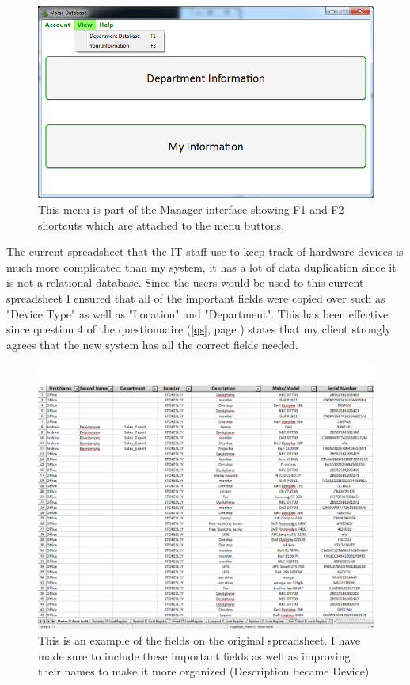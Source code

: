 \begin{figure}[H]
    \includegraphics[width=\textwidth]{./Evaluation/Images/shortcuts2.png}
    \caption{This menu is part of the Manager interface showing F1 and F2 shortcuts which are attached to the menu buttons.} 
\end{figure}


The current spreadsheet that the IT staff use to keep track of hardware devices is much more complicated than my system, it has a lot of data duplication since it is not a relational database. Since the users would be used to this current spreadsheet I ensured that all of the important fields were copied over such as "Device Type" as well as "Location" and "Department". This has been effective since question 4 of the questionnaire (\ref{qs}, page \pageref{qs}) states that my client strongly agrees that the new system has all the correct fields needed.

\begin{figure}[H]
    \includegraphics[width=\textwidth]{./Evaluation/Images/spreadsheet.png}
    \caption{This is an example of the fields on the original spreadsheet. I have made sure to include these important fields as well as improving their names to make it more organized (Description became Device)} 
\end{figure}

